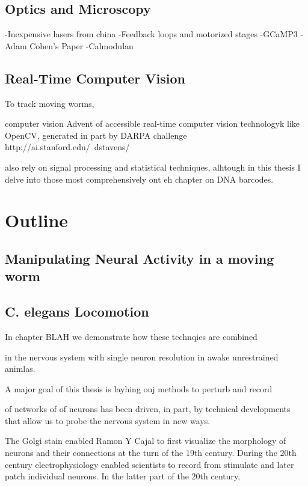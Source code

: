 \subsection{Optics and Microscopy}
-Inexpensive lasers from china
-Feedback loops and motorized stages
-GCaMP3
-Adam Cohen's Paper
-Calmodulan

\subsection{Real-Time Computer Vision} 
To track moving worms, 

computer vision
Advent of accessible real-time computer vision technologyk like OpenCV, generated in part by DARPA challenge http://ai.stanford.edu/~dstavens/

also rely on signal processing and statistical techniques, alhtough in this thesis I delve into those most comprehensively ont eh chapter on DNA barcodes.

\section{Outline}
\subsection{Manipulating Neural Activity in a moving worm}

\subsection{C. elegans Locomotion}
In chapter BLAH we demonstrate how these technqies are combined 


in the nervous system with single neuron resolution in awake unrestrained animlas. 

A major goal of this thesis is layhing ouj methods to perturb and record 








 of networks of of neurons has been driven, in part, by technical developments that allow us to probe the nervous system in new ways. 

The Golgi stain  enabled Ramon Y Cajal to first visualize the morphology of neurons and their connections at the turn of the 19th century. During the 20th century electrophysiology enabled scientists to record from stimulate and later patch individual neurons. In the latter part of the 20th century, 







